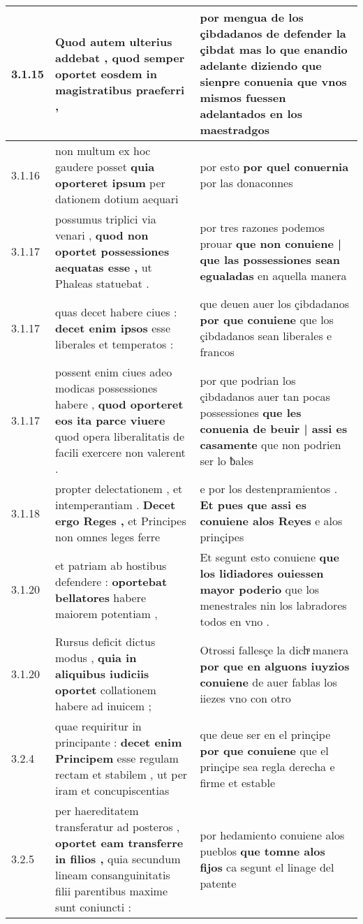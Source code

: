 \begin{tabular}{|p{1cm}|p{6.5cm}|p{6.5cm}|}
3.1.15 & Quod autem ulterius addebat , \textbf{ quod semper oportet } eosdem in magistratibus praeferri , & por mengua de los çibdadanos de defender la çibdat mas lo que enandio adelante diziendo \textbf{ que sienpre conuenia } que vnos mismos fuessen adelantados en los maestradgos \\\hline
3.1.16 & non multum ex hoc gaudere posset \textbf{ quia oporteret ipsum } per dationem dotium aequari & por esto \textbf{ por quel conuernia } por las donaconnes \\\hline
3.1.17 & possumus triplici via venari , \textbf{ quod non oportet possessiones aequatas esse , } ut Phaleas statuebat . & por tres razones podemos prouar \textbf{ que non conuiene | que las possessiones sean egualadas } en aquella manera \\\hline
3.1.17 & quas decet habere ciues : \textbf{ decet enim ipsos } esse liberales et temperatos : & que deuen auer los çibdadanos \textbf{ por que conuiene } que los çibdadanos sean liberales e francos \\\hline
3.1.17 & possent enim ciues adeo modicas possessiones habere , \textbf{ quod oporteret eos ita parce viuere } quod opera liberalitatis de facili exercere non valerent . & por que podrian los çibdadanos auer tan pocas possessiones \textbf{ que les conuenia de beuir | assi es casamente } que non podrien ser lo ƀales \\\hline
3.1.18 & propter delectationem , et intemperantiam . \textbf{ Decet ergo Reges , } et Principes non omnes leges ferre & e por los destenpramientos . \textbf{ Et pues que assi es conuiene alos Reyes } e alos prinçipes \\\hline
3.1.20 & et patriam ab hostibus defendere : \textbf{ oportebat bellatores } habere maiorem potentiam , & Et segunt esto conuiene \textbf{ que los lidiadores ouiessen mayor poderio } que los menestrales nin los labradores todos en vno . \\\hline
3.1.20 & Rursus deficit dictus modus , \textbf{ quia in aliquibus iudiciis oportet } collationem habere ad inuicem ; & Otrossi fallesçe la dichͣ manera \textbf{ por que en alguons iuyzios conuiene } de auer fablas los iiezes vno con otro \\\hline
3.2.4 & quae requiritur in principante : \textbf{ decet enim Principem } esse regulam rectam et stabilem , ut per iram et concupiscentias & que deue ser en el prinçipe \textbf{ por que conuiene } que el prinçipe sea regla derecha e firme et estable \\\hline
3.2.5 & per haereditatem transferatur ad posteros , \textbf{ oportet eam transferre in filios , } quia secundum lineam consanguinitatis filii parentibus maxime sunt coniuncti : & por hedamiento conuiene alos pueblos \textbf{ que tomne alos fijos } ca segunt el linage del patente \\\hline

\end{tabular}
